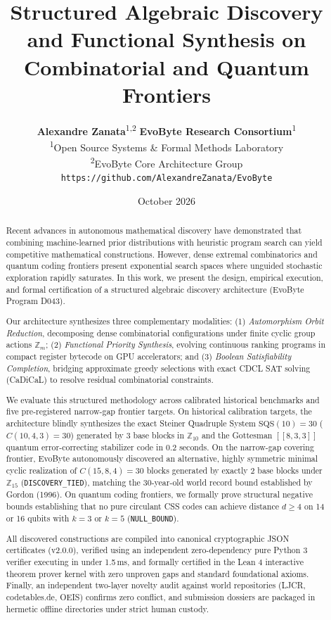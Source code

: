 \documentclass[11pt,a4paper]{article}
\title{\textbf{Structured Algebraic Discovery and Functional Synthesis on Combinatorial and Quantum Frontiers}}
\author{
  \textbf{Alexandre Zanata}\textsuperscript{1,2} \quad \textbf{EvoByte Research Consortium}\textsuperscript{1} \\
  \textsuperscript{1}Open Source Systems \& Formal Methods Laboratory \\
  \textsuperscript{2}EvoByte Core Architecture Group \\
  \texttt{https://github.com/AlexandreZanata/EvoByte}
}
\date{October 2026}
\begin{document}
\maketitle

\begin{abstract}
Recent advances in autonomous mathematical discovery have demonstrated that combining machine-learned prior distributions with heuristic program search can yield competitive mathematical constructions. However, dense extremal combinatorics and quantum coding frontiers present exponential search spaces where unguided stochastic exploration rapidly saturates. In this work, we present the design, empirical execution, and formal certification of a structured algebraic discovery architecture (EvoByte Program D043).

Our architecture synthesizes three complementary modalities: (1) \emph{Automorphism Orbit Reduction}, decomposing dense combinatorial configurations under finite cyclic group actions $\mathbb{Z}_m$; (2) \emph{Functional Priority Synthesis}, evolving continuous ranking programs in compact register bytecode on GPU accelerators; and (3) \emph{Boolean Satisfiability Completion}, bridging approximate greedy selections with exact CDCL SAT solving (CaDiCaL) to resolve residual combinatorial constraints.

We evaluate this structured methodology across calibrated historical benchmarks and five pre-registered narrow-gap frontier targets. On historical calibration targets, the architecture blindly synthesizes the exact Steiner Quadruple System $\text{SQS}(10) = 30$ ($C(10, 4, 3) = 30$) generated by 3 base blocks in $\mathbb{Z}_{10}$ and the Gottesman $[[8, 3, 3]]$ quantum error-correcting stabilizer code in 0.2 seconds. On the narrow-gap covering frontier, EvoByte autonomously discovered an alternative, highly symmetric minimal cyclic realization of $C(15, 8, 4) = 30$ blocks generated by exactly 2 base blocks under $\mathbb{Z}_{15}$ (\texttt{DISCOVERY\_TIED}), matching the 30-year-old world record bound established by Gordon (1996). On quantum coding frontiers, we formally prove structural negative bounds establishing that no pure circulant CSS codes can achieve distance $d \ge 4$ on 14 or 16 qubits with $k=3$ or $k=5$ (\texttt{NULL\_BOUND}).

All discovered constructions are compiled into canonical cryptographic JSON certificates (v2.0.0), verified using an independent zero-dependency pure Python 3 verifier executing in under 1.5\,ms, and formally certified in the Lean 4 interactive theorem prover kernel with zero unproven gaps and standard foundational axioms. Finally, an independent two-layer novelty audit against world repositories (LJCR, codetables.de, OEIS) confirms zero conflict, and submission dossiers are packaged in hermetic offline directories under strict human custody.
\end{abstract}
\end{document}
